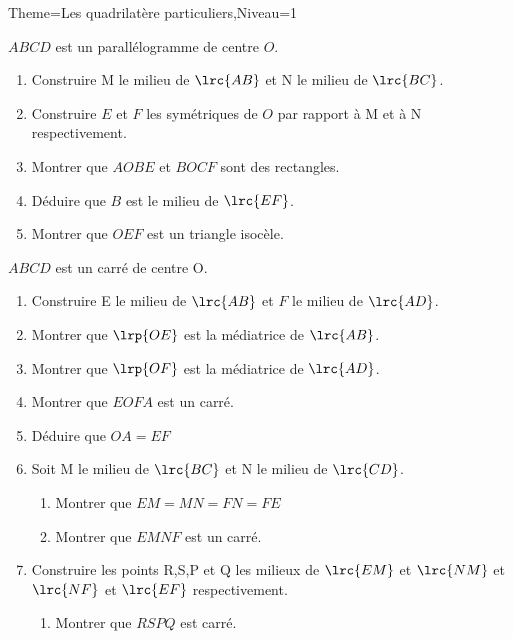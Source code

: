 \documentclass[a4paper,12pt]{article}
\begin{document}
\begin{Maquette}[Fiche]{Theme=Les quadrilatère particuliers,Niveau=1}
\begin{exercice}
$ABCD$ est un parallélogramme de centre $O$.
\begin{enumerate}
\item Construire M le milieu de $\lrc{AB}$ et N le milieu de $\lrc{BC}$.
\item Construire $E$ et $F$ les symétriques de $O$ par rapport à M et à N respectivement.
\item Montrer que $AOBE$ et $BOCF$ sont des rectangles.
\item Déduire que $B$ est le milieu de $\lrc{EF}$.
\item Montrer que $OEF$ est un triangle isocèle.
\end{enumerate}
\end{exercice}

\begin{exercice}
$ABCD$ est un carré de centre O.
\begin{enumerate}
\item Construire E le milieu de $\lrc{AB}$ et $F$ le milieu de $\lrc{AD}$.
\item Montrer que $\lrp{OE}$ est la médiatrice de $\lrc{AB}$.
\item Montrer que $\lrp{OF}$ est la médiatrice de $\lrc{AD}$.
\item Montrer que $EOFA$ est un carré.
\item Déduire que $OA=EF$
\item Soit M le milieu de $\lrc{BC}$ et N le milieu de $\lrc{CD}$.
\begin{enumerate}
\item Montrer que $EM=MN=FN=FE$
\item Montrer que $EMNF$ est un carré.
\end{enumerate}
\item Construire les points R,S,P et Q les milieux de $\lrc{EM}$ et $\lrc{NM}$ et $\lrc{NF}$ et $\lrc{EF}$ respectivement.
\begin{enumerate}
\item Montrer que $RSPQ$ est carré.
\end{enumerate}
\end{enumerate}
\end{exercice}


\end{Maquette}
\end{document}
